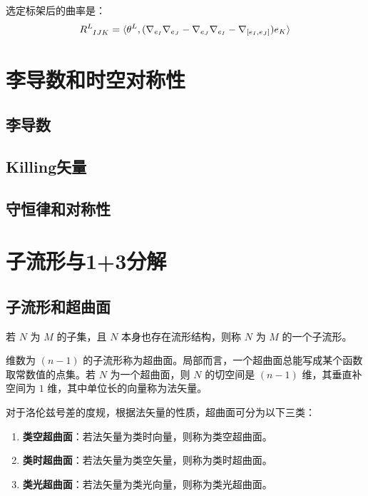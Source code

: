 选定标架后的曲率是：
\begin{equation}
    \tensor{R}{^L_{I J K}} = \langle \theta^L, (\nabla_{e_I} \nabla_{e_J} - \nabla_{e_J} \nabla_{e_I} - \nabla_{[e_I, e_J]}) e_K \rangle
\end{equation}
\newpage

\section{李导数和时空对称性}
\subsection{李导数}
\subsection{Killing矢量}
\subsection{守恒律和对称性}

\section{子流形与1+3分解}
\subsection{子流形和超曲面}
\begin{definition}[子流形]
    若 $N$ 为 $M$ 的子集，且 $N$ 本身也存在流形结构，则称 $N$ 为 $M$ 的一个子流形。
\end{definition}

\begin{definition}[超曲面与法矢量]
    维数为 $(n-1)$ 的子流形称为超曲面。局部而言，一个超曲面总能写成某个函数取常数值的点集。若 $N$ 为一个超曲面，则 $N$ 的切空间是 $(n-1)$ 维，其垂直补空间为 $1$ 维，其中单位长的向量称为法矢量。
\end{definition}
\begin{definition}[超曲面的分类]
    对于洛伦兹号差的度规，根据法矢量的性质，超曲面可分为以下三类：
    \begin{enumerate}
        \item \textbf{类空超曲面}：若法矢量为类时向量，则称为类空超曲面。
        \item \textbf{类时超曲面}：若法矢量为类空矢量，则称为类时超曲面。
        \item \textbf{类光超曲面}：若法矢量为类光向量，则称为类光超曲面。
    \end{enumerate}
\end{definition}

